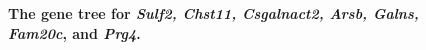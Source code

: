 \documentclass{article}
\begin{document}
\begin{figure}[H]
\centering
{}
\caption{\textbf{The gene tree for \textit{Sulf2, Chst11, Csgalnact2, Arsb, Galns, Fam20c}, and \textit{Prg4}.}}
\label{sup_fig_16}
\end{figure}
\end{document}
